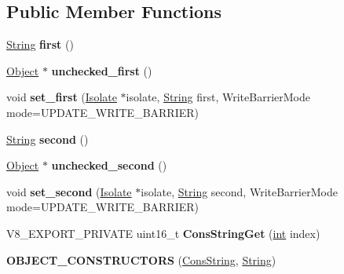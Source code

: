 \subsection*{Public Member Functions}
\begin{DoxyCompactItemize}
\item 
\mbox{\label{classv8_1_1internal_1_1ConsString_ab3a00e9b2aad3d5bbc56ebaf5fec627e}} 
\mbox{\hyperlink{classv8_1_1internal_1_1String}{String}} {\bfseries first} ()
\item 
\mbox{\label{classv8_1_1internal_1_1ConsString_ac2ec1588574736752932d69bedf1d050}} 
\mbox{\hyperlink{classv8_1_1internal_1_1Object}{Object}} $\ast$ {\bfseries unchecked\+\_\+first} ()
\item 
\mbox{\label{classv8_1_1internal_1_1ConsString_a6133559bd9b64323a7ced76111cc825e}} 
void {\bfseries set\+\_\+first} (\mbox{\hyperlink{classv8_1_1internal_1_1Isolate}{Isolate}} $\ast$isolate, \mbox{\hyperlink{classv8_1_1internal_1_1String}{String}} first, Write\+Barrier\+Mode mode=U\+P\+D\+A\+T\+E\+\_\+\+W\+R\+I\+T\+E\+\_\+\+B\+A\+R\+R\+I\+ER)
\item 
\mbox{\label{classv8_1_1internal_1_1ConsString_af875d29e59fdb398bf6babe2e6a35f40}} 
\mbox{\hyperlink{classv8_1_1internal_1_1String}{String}} {\bfseries second} ()
\item 
\mbox{\label{classv8_1_1internal_1_1ConsString_a68c3b0092484be42ba7681d62a5ede12}} 
\mbox{\hyperlink{classv8_1_1internal_1_1Object}{Object}} $\ast$ {\bfseries unchecked\+\_\+second} ()
\item 
\mbox{\label{classv8_1_1internal_1_1ConsString_a2314ed222a8f511458cab34a6dd8d147}} 
void {\bfseries set\+\_\+second} (\mbox{\hyperlink{classv8_1_1internal_1_1Isolate}{Isolate}} $\ast$isolate, \mbox{\hyperlink{classv8_1_1internal_1_1String}{String}} second, Write\+Barrier\+Mode mode=U\+P\+D\+A\+T\+E\+\_\+\+W\+R\+I\+T\+E\+\_\+\+B\+A\+R\+R\+I\+ER)
\item 
\mbox{\label{classv8_1_1internal_1_1ConsString_a4599e754c6c77c4f814f5d53246e78b0}} 
V8\+\_\+\+E\+X\+P\+O\+R\+T\+\_\+\+P\+R\+I\+V\+A\+TE uint16\+\_\+t {\bfseries Cons\+String\+Get} (\mbox{\hyperlink{classint}{int}} index)
\item 
\mbox{\label{classv8_1_1internal_1_1ConsString_ac3233486d03a83886d439515520494bf}} 
{\bfseries O\+B\+J\+E\+C\+T\+\_\+\+C\+O\+N\+S\+T\+R\+U\+C\+T\+O\+RS} (\mbox{\hyperlink{classv8_1_1internal_1_1ConsString}{Cons\+String}}, \mbox{\hyperlink{classv8_1_1internal_1_1String}{String}})
\end{DoxyCompactItemize}
